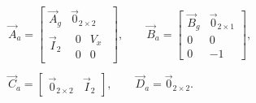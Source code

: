 \begin{equation}
\begin{array}{cc} 
\vec{A}_a=\begin{bmatrix}
\vec{A}_g&\vec{0}_{2\times2}\\
\vec{I}_2&\begin{matrix}
0&V_x\\
0&0
\end{matrix}
\end{bmatrix},
\qquad
\vec{B}_a=\begin{bmatrix}
\vec{B}_g&\vec{0}_{2\times1}\\
0&0\\
0&-1
\end{bmatrix},
\\\\
\vec{C}_a=\begin{bmatrix}
\vec{0}_{2\times2}&\vec{I}_2
\end{bmatrix}, 
\qquad
\vec{D}_a=
\vec{0}_{2\times2}. 
\end{array}
\end{equation}

